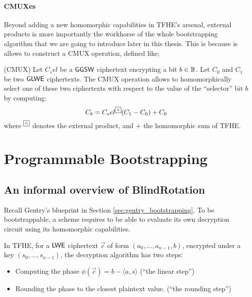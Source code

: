 

\paragraph{CMUXes}

Beyond adding a new homomorphic capabilities in TFHE's arsenal, external products is more importantly the workhorse of the whole bootstrapping algorithm that we are going to introduce later in this thesis. This is because is allows to construct a CMUX operation, defined like;

\begin{definition}(CMUX)
	Let $C_sel$ be a $\textsf{GGSW}$ ciphertext encrypting a bit $b \in \mathbb{B}$. Let $C_0$ and $C_1$ be two $\textsf{GLWE}$ ciphertexts. The CMUX operation allows to homomorphically select one of these two ciphertexts with respect to the value of the ``selector'' bit $b$ by computing:
	\begin{equation*}
		C_b = C_sel \squarewithdot (C_1 - C_0) + C_0
	\end{equation*}
	where $\squarewithdot$ denotes the external product, and $+$ the homomorphic sum of TFHE.
\end{definition}







\section{Programmable Bootstrapping}


\subsection{An informal overview of BlindRotation}

Recall Gentry's blueprint in Section \ref{sec:gentry_bootstrapping}. To be bootstrappable, a scheme requires to be able to evaluate its own decryption circuit using its homomorphic capabilities.

In TFHE, for a $\textsf{LWE}$ ciphertext $\vec c$ of form $(a_0, \dots, a_{n-1}, b)$, encrypted under a key $(s_0, \dots, s_{n-1})$, the decryption algorithm has two steps:
\begin{itemize}
	\item Computing the phase $\phi(\vec c) = b - \langle a, s \rangle$ (``the linear step'')
	\item Rounding the phase to the closest plaintext value. (``the rounding step'')
\end{itemize}

